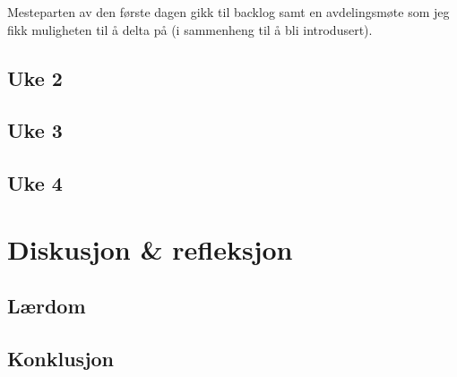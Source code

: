 \documentclass[11pt, a4paper]{report}
\begin{document}
Mesteparten av den første dagen gikk til backlog samt en avdelingsmøte som jeg fikk muligheten til å delta på (i sammenheng til å bli introdusert).
\section{Uke 2}
\section{Uke 3}
\section{Uke 4}

\chapter{Diskusjon \& refleksjon}
\section{Lærdom}


\section{Konklusjon}
\end{document}
